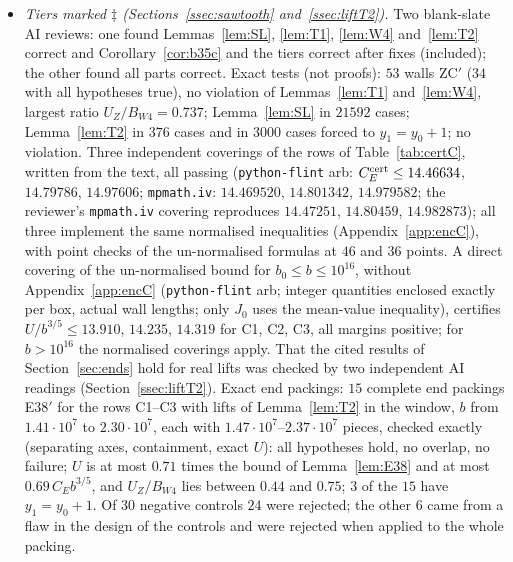 \documentclass[11pt]{amsart}
\theoremstyle{definition}
\theoremstyle{remark}
\numberwithin{equation}{section}
\begin{document}
\begin{itemize}
parameters of the tiers B1, B1s and B2: all valid; seven of the eight satisfy all hypotheses and are within the bound of
Lemma~\ref{lem:E38}; in the eighth (B1, $b=1.5\cdot10^6$, $y=59407/4$) hypothesis (E-v) fails for the lower right wall,
which was filled by rows only (a convention, not part of the construction), so the bound of Lemma~\ref{lem:E38} does not
apply there. Pointwise check of
Corollary~\ref{cor:b35} at $5850$ points: passed. $29$ of $30$ negative controls were rejected; the remaining one is a
valid packing.
\item \emph{Tiers marked $\ddagger$ (Sections~\ref{ssec:sawtooth} and~\ref{ssec:liftT2}).} Two blank-slate AI reviews:
one found Lemmas~\ref{lem:SL}, \ref{lem:T1}, \ref{lem:W4} and~\ref{lem:T2} correct and Corollary~\ref{cor:b35c} and the
tiers correct after fixes (included); the other found all parts correct. Exact tests (not proofs): $53$ walls ZC$'$
($34$ with all hypotheses true), no violation of Lemmas~\ref{lem:T1} and~\ref{lem:W4}, largest ratio $U_Z/B_{W4}=0.737$;
Lemma~\ref{lem:SL} in $21592$ cases; Lemma~\ref{lem:T2} in $376$ cases and in $3000$ cases forced to $y_1=y_0+1$; no
violation. Three independent coverings of the rows of Table~\ref{tab:certC}, written from the text, all passing
(\texttt{python-flint} arb: $C_E^{\rm cert}\le14.46634$, $14.79786$, $14.97606$; \texttt{mpmath.iv}: $14.469520$, $14.801342$,
$14.979582$; the reviewer's \texttt{mpmath.iv} covering reproduces $14.47251$, $14.80459$, $14.982873$); all three implement
the same normalised inequalities (Appendix~\ref{app:encC}), with point checks of the un-normalised formulas at $46$ and
$36$ points. A direct covering of the un-normalised bound for $b_0\le b\le10^{16}$, without Appendix~\ref{app:encC}
(\texttt{python-flint} arb; integer quantities enclosed exactly per box, actual wall lengths; only $J_0$ uses the
mean-value inequality), certifies $U/b^{3/5}\le13.910$, $14.235$, $14.319$ for C1, C2, C3, all margins positive; for
$b>10^{16}$ the normalised coverings apply. That the cited results of Section~\ref{sec:ends} hold for real lifts was
checked by two independent AI readings (Section~\ref{ssec:liftT2}). Exact end packings: $15$ complete end packings E38$'$
for the rows C1--C3 with lifts of Lemma~\ref{lem:T2} in the window, $b$ from $1.41\cdot10^7$ to $2.30\cdot10^7$, each with
$1.47\cdot10^7$--$2.37\cdot10^7$ pieces, checked exactly (separating axes, containment, exact $U$): all hypotheses hold,
no overlap, no failure; $U$ is at most $0.71$ times the bound of Lemma~\ref{lem:E38} and at most $0.69\,C_Eb^{3/5}$, and
$U_Z/B_{W4}$ lies between $0.44$ and $0.75$; $3$ of the $15$ have $y_1=y_0+1$. Of $30$ negative controls $24$ were
rejected; the other $6$ came from a flaw in the design of the controls and were rejected when applied to the whole
packing.
\end{itemize}
\end{document}

